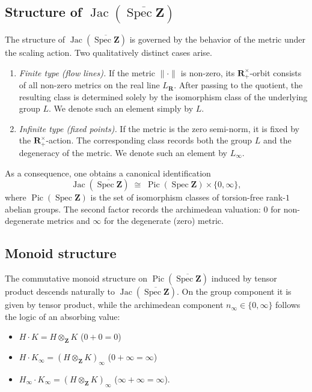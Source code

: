\documentclass[11pt,a4paper]{article}
\newcommand{\Z}{\mathbf{Z}}
\newcommand{\R}{\mathbf{R}}
\def\spz{\Spec \Z}
\def\spzb{\overline{\Spec \Z}}
\newcommand{\Spec}{\operatorname{Spec}}
\def\Pic{\operatorname{Pic}}
\def\Jac{\operatorname{Jac}}
\def\spz{\Spec \Z}
\theoremstyle{plain}
\theoremstyle{definition} %
\begin{document}
\subsection{Structure of $\Jac(\spzb)$}

The structure of  $\Jac(\spzb)$ is governed by the behavior of the metric under the
scaling action.
Two qualitatively distinct cases arise.
\begin{enumerate}[leftmargin=*, labelindent=0pt]
\item \emph{Finite type (flow lines).}
If the metric $\|\cdot\|$ is non-zero, its $\R_+^\times$-orbit consists of all non-zero
metrics on the real line $L_\R$.
After passing to the quotient, the resulting class is determined solely by the
isomorphism class of the underlying group $L$.
We denote such an element simply by $L$.

\item \emph{Infinite type (fixed points).}
If the metric is the zero semi-norm, it is fixed by the $\R_+^\times$-action.
The corresponding class records both the group $L$ and the degeneracy of the metric.
We denote such an element by $L_\infty$.
\end{enumerate}

As a consequence, one obtains a canonical identification
\[
\Jac(\spzb)\;\cong\; \Pic(\spz)\times\{0,\infty\},
\]
where $\Pic(\spz)$ is the set of isomorphism classes of torsion-free rank-$1$
abelian groups.
The second factor records the archimedean valuation: $0$ for non-degenerate metrics
and $\infty$ for the degenerate (zero) metric.



\subsection{Monoid structure}

The commutative monoid structure on $\Pic(\spzb)$ induced by tensor product
descends naturally to $\Jac(\spzb)$.
On the group component it is given by tensor product, while the archimedean component $n_\infty\in\{0,\infty\}$
follows the logic of an absorbing value:
\begin{itemize}[leftmargin=*, labelindent=0pt]
\item[-] $H\cdot K = H\otimes_\Z K$ \hfill ($0+0=0$)
\item[-] $H\cdot K_\infty = (H\otimes_\Z K)_\infty$ \hfill ($0+\infty=\infty$)
\item[-] $H_\infty\cdot K_\infty = (H\otimes_\Z K)_\infty$ \hfill ($\infty+\infty=\infty$).
\end{itemize}
\end{document}
